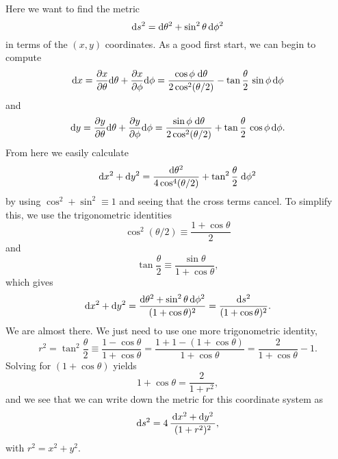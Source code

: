 \documentclass[11pt,a4paper, 
swedish, english %
]{article}
\begin{document}
Here we want to find the metric 
\begin{equation}
\mathrm{d}{s}^2=\mathrm{d}\theta^2+\sin^2\theta\,\mathrm{d}\phi^2
\end{equation}
in terms of the $(x,y)$ coordinates. As a good first start, we can
begin to compute
\begin{equation}
\mathrm{d}{x}=\pdv{x}{\theta}\mathrm{d}\theta+\pdv{x}{\phi}\mathrm{d}\phi
=\frac{\cos\phi\;\mathrm{d}\theta}{2\cos^2(\theta/2)}
-\tan\frac{\theta}{2}\,\sin\phi\,\mathrm{d}\phi
\end{equation}
and
\begin{equation}
\mathrm{d}{y}=\pdv{y}{\theta}\mathrm{d}\theta+\pdv{y}{\phi}\mathrm{d}\phi
=\frac{\sin\phi\;\mathrm{d}\theta}{2\cos^2(\theta/2)}
+\tan\frac{\theta}{2}\,\cos\phi\,\mathrm{d}\phi.
\end{equation}
From here we easily calculate
\begin{equation}
\mathrm{d}{x}^2+\mathrm{d}{y}^2=
\frac{\mathrm{d}\theta^2}{4\cos^4(\theta/2)} 
+\tan^2\frac{\theta}{2}\;\mathrm{d}\phi^2
\end{equation}
by using $\cos^2+\sin^2\equiv1$ and seeing that the cross
terms cancel. To simplify this, we use the trigonometric identities
\begin{equation}
\cos^2(\theta/2)\equiv\frac{1+\cos\theta}{2}
\end{equation}
and
\begin{equation}
\tan\frac{\theta}{2}\equiv \frac{\sin\theta}{1+\cos\theta},
\end{equation}
which gives
\begin{equation}
\mathrm{d}{x}^2+\mathrm{d}{y}^2
=\frac{\mathrm{d}\theta^2+\sin^2\theta\,\mathrm{d}\phi^2}{(1+\cos\theta)^2} 
=\frac{\mathrm{d}{s}^2}{(1+\cos\theta)^2}.
\end{equation}
We are almost there. We just need to use one more trigonometric
identity,
\begin{equation}
r^2=\tan^2\frac{\theta}{2}\equiv
\frac{1-\cos\theta}{1+\cos\theta}
=\frac{1+1-(1+\cos\theta)}{1+\cos\theta}
=\frac{2}{1+\cos\theta}-1.
\end{equation}
Solving for $(1+\cos\theta)$ yields
\begin{equation}
1+\cos\theta=\frac{2}{1+r^2},
\end{equation}
and we see that we can write down the metric for this coordinate
system as
\begin{equation}\label{eq4:ds2-sphere}
\mathrm{d}{s}^2=4\,\frac{\,\mathrm{d}{x}^2+\mathrm{d}{y}^2\,}{(1+r^2)^2},
\end{equation}
with $r^2=x^2+y^2$.
\end{document}
